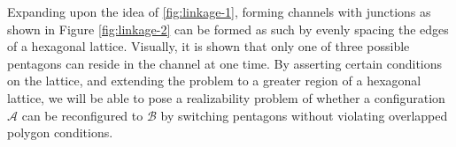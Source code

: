 Expanding upon the idea of \ref{fig:linkage-1}, forming channels with junctions as shown in Figure 
\ref{fig:linkage-2} can be formed as such by evenly spacing the edges of a hexagonal lattice.  
Visually, it is shown that only one of three possible pentagons can reside in the channel at one 
time.  By asserting certain conditions on the lattice, and extending the problem to a greater region 
of a hexagonal lattice, we will be able to pose a realizability problem of whether a configuration 
$\mathcal{A}$ can be reconfigured to $\mathcal{B}$ by switching pentagons without violating 
overlapped polygon conditions.

